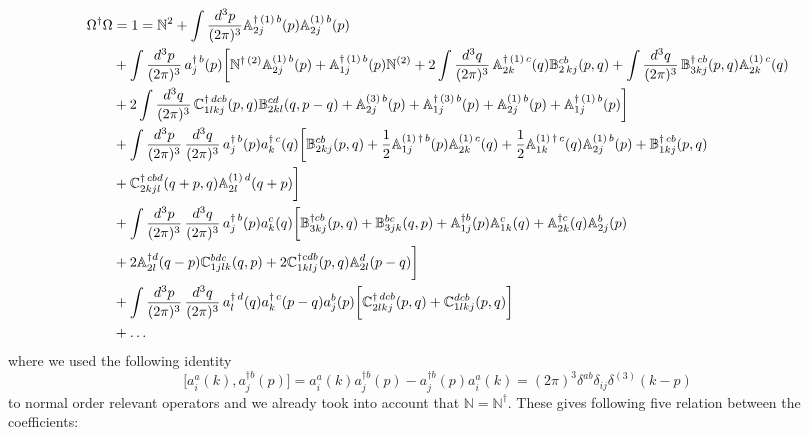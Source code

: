 \documentclass[aps,prd,amsmath,amssymb,nofootinbib]{revtex4-2}
\def\mf#1{\mathbb{#1}}
\numberwithin{equation}{section}
\begin{document}
\begin{align}
     \Omega^{\dagger}\Omega & = 1 = \mf{N}^{2} + \int \frac{d^{3}p}{(2\pi)^{3}} \mf{A}^{\dagger\,(1)\, b}_{2j}(p)\mf{A}^{(1)\,b}_{2j}(p) \notag \\ & +\int \frac{d^{3}p}{(2\pi)^{3}}\, a^{\dagger\, b}_{j}(p) \bigg[\mf{N}^{\dagger\, (2)}\mf{A}^{(1)\, b}_{2j}(p)+\mf{A}^{\dagger\,(1)\, b}_{1j}(p)\mf{N}^{(2)} + 2\int\frac{d^{3}q}{(2\pi)^{3}}\,\mf{A}^{\dagger\,(1)\, c}_{2k}(q)\mf{B}^{cb}_{2\,kj}(p,q)+\int\frac{d^{3}q}{(2\pi)^{3}}\,\mf{B}^{\dagger\, cb}_{3kj}(p,q)\mf{A}^{(1)\,c}_{2k}(q)\notag \\ & +2\int\frac{d^{3}q}{(2\pi)^{3}}\,\mf{C}^{\dagger\, dcb}_{1lkj}(p,q)\mf{B}^{cd}_{2kl}(q,p-q)+\mf{A}^{(3)\, b}_{2j}(p)+\mf{A}^{\dagger\,(3)\, b}_{1j}(p)+\mf{A}^{(1)\, b}_{2j}(p)+\mf{A}^{\dagger\,(1)\, b}_{1j}(p)\bigg]\notag \\ & + \int \frac{d^{3}p}{(2\pi)^{3}}\, \frac{d^{3}q}{(2\pi)^{3}}\, a^{\dagger\, b}_{j}(p)a^{\dagger\, c}_{k}(q) \bigg[\mf{B}^{cb}_{2kj}(p,q)+\frac{1}{2}\mf{A}^{(1)\, \dagger\, b}_{1j}(p)\mf{A}^{(1)\, c}_{2k}(q)+\frac{1}{2} \mf{A}^{(1)\, \dagger\, c}_{1k}(q)\mf{A}^{(1)\, b}_{2j}(p)+\mf{B}^{\dagger\, cb}_{1kj}(p,q)\notag \\ & +\mf{C}^{\dagger\, cbd}_{2kjl}(q+p,q)\mf{A}^{(1)\,d}_{2l}(q+p)\bigg] \notag \\ & 
     + \int \frac{d^{3}p}{(2\pi)^{3}}\, \frac{d^{3}q}{(2\pi)^{3}}\, a^{\dagger\, b}_{j}(p)a^{ c}_{k}(q) \bigg[\mf{B}^{\dagger cb}_{3kj}(p,q)+\mf{B}^{bc}_{3jk}(q,p)+\mf{A}^{\dagger b}_{1j}(p)\mf{A}^{c}_{1k}(q) + \mf{A}^{\dagger c}_{2k}(q)\mf{A}^{b}_{2j}(p) \notag \\ & 
    + 2 \mf{A}^{\dagger d}_{2l}(q-p)\mf{C}^{bdc}_{1jlk}(q,p)
    + 2 
    \mf{C}^{\dagger cdb}_{1klj}
    (p,q)\mf{A}^{d}_{2l}(p-q) \bigg] \notag \\ & 
    + \int \frac{d^{3}p}{(2\pi)^{3}}\, \frac{d^{3}q}{(2\pi)^{3}}\, a^{\dagger\, d}_{l}(q)a^{\dagger\, c}_{k}(p-q)a^{b}_{j}(p)\bigg[\mf{C}^{\dagger\, dcb}_{2lkj}(p,q)+\mf{C}^{dcb}_{1lkj}(p,q)\bigg]\notag \\ & + \ldots
\end{align}  
where we used the following identity
\begin{equation}
    \bigg[a^{a}_{i}(k),a^{\dagger b}_{j}(p)\bigg] = a^{a}_{i}(k)a^{\dagger b}_{j}(p) - a^{\dagger b}_{j}(p)a^{a}_{i}(k)= (2\pi)^{3}\delta^{ab}\delta_{ij}\delta^{(3)}(k-p)
\end{equation}
to normal order relevant operators and we  already took into account that $\mf{N} = \mf{N}^\dagger  $. These gives following five relation between the coefficients: 
\end{document}
